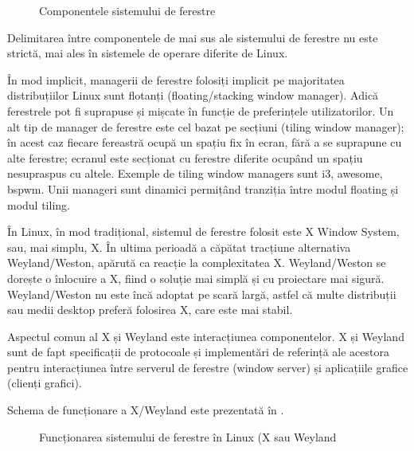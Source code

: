 \begin{figure}[htbp]
  \centering
  \def\svgwidth{\columnwidth}
  
  \caption{Componentele sistemului de ferestre}
  \label{fig:ui:window-system}
\end{figure}

Delimitarea între componentele de mai sus ale sistemului de ferestre nu este strictă, mai ales în sistemele de operare diferite de Linux.

În mod implicit, managerii de ferestre folosiți implicit pe majoritatea distribuțiilor Linux sunt flotanți (floating/stacking window manager). Adică ferestrele pot fi suprapuse și mișcate în funcție de preferințele utilizatorilor. Un alt tip de manager de ferestre este cel bazat pe secțiuni (tiling window manager); în acest caz fiecare fereastră ocupă un spațiu fix în ecran, fără a se suprapune cu alte ferestre; ecranul este secționat cu ferestre diferite ocupând un spațiu nesupraspus cu altele. Exemple de tiling window managers sunt i3, awesome, bspwm. Unii manageri sunt dinamici permițând tranziția între modul floating și modul tiling.

În Linux, în mod tradițional, sistemul de ferestre folosit este X Window System, sau, mai simplu, X. În ultima perioadă a căpătat tracțiune alternativa Weyland/Weston, apărută ca reacție la complexitatea X. Weyland/Weston se dorește o înlocuire a X, fiind o soluție mai simplă și cu proiectare mai sigură. Weyland/Weston nu este încă adoptat pe scară largă, astfel că multe distribuții sau medii desktop preferă folosirea X, care este mai stabil.

Aspectul comun al X și Weyland este interacțiunea componentelor. X și Weyland sunt de fapt specificații de protocoale și implementări de referință ale acestora pentru interacțiunea între serverul de ferestre (window server) și aplicațiile grafice (clienți grafici).

Schema de funcționare a X/Weyland este prezentată în .

\begin{figure}[htbp]
  \centering
  \def\svgwidth{\columnwidth}
  
  \caption{Funcționarea sistemului de ferestre în Linux (X sau Weyland}
  \label{fig:ui:x-window-system}
\end{figure}

